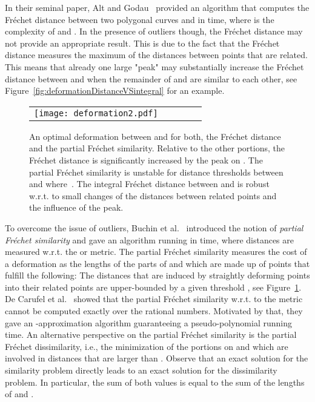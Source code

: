 \documentclass[a4paper,11pt]{article}
\begin{document}
In their seminal paper, Alt and Godau~\cite{alt:computing} provided an algorithm that computes the Fr\'{e}chet distance between two polygonal curves  and  in  time, where  is the complexity of  and . In the presence of outliers though, the Fr\'{e}chet distance may not provide an appropriate result. This is due to the fact that the Fr\'{e}chet distance measures the maximum of the distances between points that are related. This means that already one large  "peak"  may substantially increase the Fr\'{e}chet distance between  and  when the remainder of  and  are similar to each other, see Figure~\ref{fig:deformationDistanceVSintegral} for an example.
	
\begin{figure}[ht]
  \begin{center}
    \begin{tabular}{ccccc}
      \texttt{[image: deformation2.pdf]} & &\\
\end{tabular}
  \end{center}
  \vspace*{-12pt}
  \caption{An optimal deformation between  and  for both, the Fr\'{e}chet distance and the partial Fr\'{e}chet similarity. Relative to the other portions, the Fr\'{e}chet distance is significantly increased by the peak on . The partial Fr\'{e}chet similarity is unstable for distance thresholds between  and  where~. The integral Fr\'{e}chet distance between  and  is robust w.r.t. to small changes of the distances between related points and the influence of the peak. }
  \label{fig:outlier}
\end{figure}
	
	To overcome the issue of outliers, Buchin et al.~\cite{buchin:exact} introduced the notion of \emph{partial Fr\'{e}chet similarity} and gave an algorithm running in  time, where distances are measured w.r.t. the  or  metric. The partial Fr\'{e}chet similarity measures the cost of a deformation as the lengths of the parts of  and  which are made up of points that fulfill the following: The distances that are induced by straightly deforming points into their related points are upper-bounded by a given threshold , see Figure~\ref{fig:outlier}. De Carufel et al.~\cite{carufel:similarity} showed that the partial Fr\'{e}chet similarity w.r.t. to the  metric cannot be computed exactly over the rational numbers. Motivated by that, they gave an -approximation algorithm guaranteeing a pseudo-polynomial running time. An alternative perspective on the partial Fr\'{e}chet similarity is the partial Fr\'{e}chet dissimilarity, i.e., the minimization of the portions on  and  which are involved in distances that are larger than . Observe that an exact solution for the similarity problem directly leads to an exact solution for the dissimilarity problem. In particular, the sum of both values is equal to the sum of the lengths of  and .
	
\end{document}
